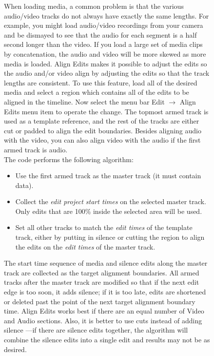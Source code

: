 \begin{figure}
When loading media, a common problem is that the various audio/video tracks do not always have exactly the same lengths. For example, you might load audio/video recordings from your camera and be dismayed to see that the audio for each segment is a half second longer than the video. If you load a large set of media clips by concatenation, the audio and video will be more skewed as more media is loaded. Align Edits makes it possible to adjust the edits so the audio and/or video align by adjusting 
the edits so that the track lengths are consistent. To use this feature, load all of the desired media and select a region which contains all of the edits to be aligned in the timeline. Now select the menu bar Edit $\rightarrow$ Align Edits menu item to operate the change. The topmost armed track is used as a template reference, and the rest of the tracks are either cut or padded to align the edit boundaries.  Besides aligning audio with the video, you can also align video with the audio if the first armed track is audio. \\
The code performs the following algorithm:
\begin{itemize}
    \item Use the first armed track as the master track (it must contain data).
    \item Collect the \textit{edit project start times} on the selected master track. Only edits that are 100\% inside the selected area will be used.
    \item Set all other tracks to match the \textit{edit times} of the template track, either by putting in silence or cutting the region to align the edits on the \textit{edit times} of the master track.
\end{itemize}
The start time sequence of media and silence edits along the master track are collected as the target 
alignment boundaries. All armed tracks after the master track are modified so that if the next edit edge 
is too soon, it adds silence; if it is too late, edits are shortened or deleted past the point of the next target
alignment boundary time.  Align Edits works best if there are an equal number of Video and Audio sections.  Also, it is better to use cuts instead of adding silence ---if there are silence edits together, the algorithm will combine the silence edits into a single edit and results may not be as desired.


\end{figure}
